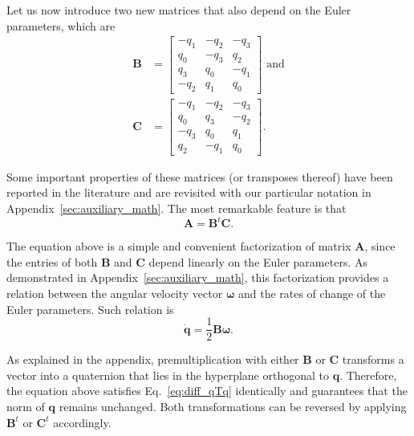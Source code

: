 \documentclass[aip,jcp,reprint,amsmath,amssymb,raggedbottom]{revtex4-1}
\newcommand{\mt}[1]{\boldsymbol{\mathbf{#1}}}           %
\newcommand{\vt}[1]{\boldsymbol{\mathbf{#1}}}           %
\newcommand{\tr}[1]{#1^t}                               %
\begin{document}
Let us now introduce two new matrices that also depend on the Euler parameters, which are
\begin{subequations}
\label{eq:def_B_and_C}
\begin{align}
\mt B &= \left[
\begin{array}{rrrr}
-q_1 & -q_2 & -q_3 \\
 q_0 & -q_3 &  q_2 \\
 q_3 &  q_0 & -q_1 \\
-q_2 &  q_1 &  q_0
\end{array}
\right] \text{ and} \label{eq:def_B} \\
\mt C &= \left[
\begin{array}{rrrr}
-q_1 & -q_2 & -q_3 \\
 q_0 &  q_3 & -q_2 \\
-q_3 &  q_0 &  q_1 \\
 q_2 & -q_1 &  q_0
\end{array}
\right].
\end{align}
\end{subequations}

Some important properties of these matrices (or transposes thereof) have been reported in the literature\cite{Haug1989, Shuster1993, Dichmann1999, Ravishankar2004, Nielsen2012} and are revisited with our particular notation in Appendix~\ref{sec:auxiliary_math}. The most remarkable feature is that
\begin{equation}
\label{eq:factorization_of_A}
{\mt A} = \tr{\mt B}{\mt C}.
\end{equation}

The equation above is a simple and convenient factorization of matrix $\mt A$, since the entries of both $\mt B$ and $\mt C$ depend linearly on the Euler parameters. As demonstrated in Appendix~\ref{sec:auxiliary_math}, this factorization provides a relation between the angular velocity vector $\vt \omega$ and the rates of change of the Euler parameters. Such relation is
\begin{equation}
\label{eq:relation_qdot_omega}
\dot{\vt q} = \frac{1}{2} \mt B \vt \omega.
\end{equation}

As explained in the appendix, premultiplication with either $\mt B$ or $\mt C$ transforms a vector into a quaternion that lies in the hyperplane orthogonal to $\vt q$. Therefore, the equation above satisfies Eq.~\ref{eq:diff_qTq} identically and guarantees that the norm of $\vt q$ remains unchanged. Both transformations can be reversed by applying $\tr{\vt B}$ or $\tr{\vt C}$ accordingly.
\end{document}
